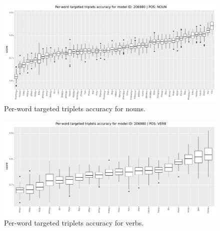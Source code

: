 \begin{figure}
  \centering
  \includegraphics[width=\textwidth]{results/targeted_triplets/results_per_word_version_206980_NOUN.pdf}
  \caption{Per-word targeted triplets accuracy for nouns.}
  \label{fig:accuracy_targeted_triplets_nouns}
\end{figure}

\begin{figure}
  \centering
  \includegraphics[width=\textwidth]{results/targeted_triplets/results_per_word_version_206980_VERB.pdf}
  \caption{Per-word targeted triplets accuracy for verbs.}
  \label{fig:accuracy_targeted_triplets_verbs}
\end{figure}
